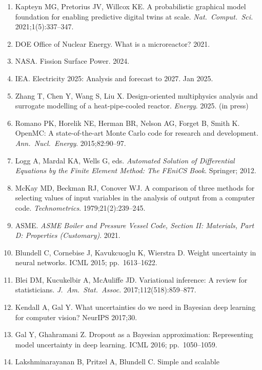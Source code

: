\documentclass[11pt,a4paper]{article}
\begin{document}
\begin{enumerate}
      \textit{Nucl.\ Eng.\ Des.} 2025;433:113690.
\item Kapteyn MG, Pretorius JV, Willcox KE. A probabilistic graphical
      model foundation for enabling predictive digital twins at scale.
      \textit{Nat.\ Comput.\ Sci.} 2021;1(5):337--347.
\item DOE Office of Nuclear Energy. What is a microreactor? 2021.
\item NASA. Fission Surface Power. 2024.
\item IEA. Electricity 2025: Analysis and forecast to 2027. Jan 2025.
\item Zhang T, Chen Y, Wang S, Liu X. Design-oriented multiphysics
      analysis and surrogate modelling of a heat-pipe-cooled reactor.
      \textit{Energy}. 2025. (in press)
\item Romano PK, Horelik NE, Herman BR, Nelson AG, Forget B, Smith K.
      OpenMC: A state-of-the-art Monte Carlo code for research and
      development. \textit{Ann.\ Nucl.\ Energy}. 2015;82:90--97.
\item Logg A, Mardal KA, Wells G, eds. \textit{Automated Solution of
      Differential Equations by the Finite Element Method: The FEniCS
      Book}. Springer; 2012.
\item McKay MD, Beckman RJ, Conover WJ. A comparison of three methods
      for selecting values of input variables in the analysis of output
      from a computer code. \textit{Technometrics}. 1979;21(2):239--245.
\item ASME. \textit{ASME Boiler and Pressure Vessel Code, Section II:
      Materials, Part D: Properties (Customary)}. 2021.
\item Blundell C, Cornebise J, Kavukcuoglu K, Wierstra D. Weight
      uncertainty in neural networks. ICML 2015; pp.\ 1613--1622.
\item Blei DM, Kucukelbir A, McAuliffe JD. Variational inference: A
      review for statisticians. \textit{J.\ Am.\ Stat.\ Assoc.}
      2017;112(518):859--877.
\item Kendall A, Gal Y. What uncertainties do we need in Bayesian deep
      learning for computer vision? NeurIPS 2017;30.
\item Gal Y, Ghahramani Z. Dropout as a Bayesian approximation:
      Representing model uncertainty in deep learning. ICML 2016;
      pp.\ 1050--1059.
\item Lakshminarayanan B, Pritzel A, Blundell C. Simple and scalable

\end{enumerate}
\end{document}
